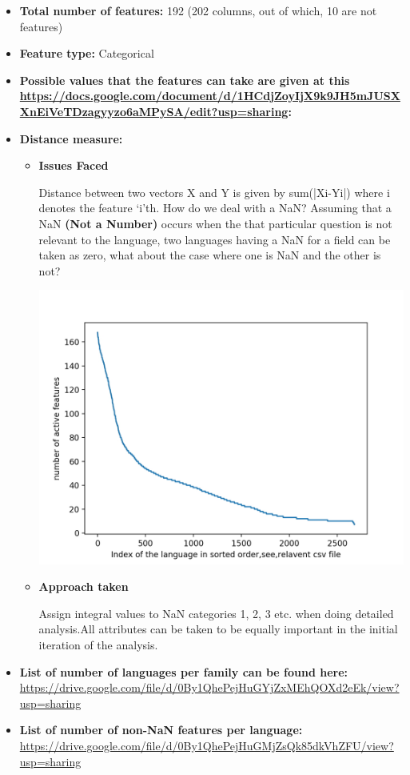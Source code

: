 \begin{itemize}
\item \textbf{Total number of features:} 192 (202 columns, out of which, 10 are not features)

 \item \textbf{Feature type:} Categorical

 \item \textbf{Possible values that the features can take are given at this \url{https://docs.google.com/document/d/1HCdjZoyIjX9k9JH5mJUSXXnEiVeTDzagyyzo6aMPySA/edit?usp=sharing}:}

 \item \textbf{Distance measure:}

\begin{itemize}
\item 
 \textbf{Issues Faced}

 Distance between two vectors X and Y is given by sum(|Xi-Yi|) where i denotes the feature ‘i’th. How do we deal with a NaN? Assuming that a NaN \textbf{(Not a Number)} occurs when the that particular question is not relevant to the language, two languages having a NaN for a field can be taken as zero, what about the case where one is NaN and the other is not?

 \includegraphics[scale=0.18]{"images/6_01.jpg"}

 \item 
 \textbf{Approach taken}

 Assign integral values to NaN categories 1, 2, 3 etc. when doing detailed analysis.All attributes can be taken to be equally important in the initial iteration of the analysis.

\end{itemize}

\item \textbf{List of number of languages per family can be found here:} \url{https://drive.google.com/file/d/0By1QhePejHuGYjZxMEhQOXd2eEk/view?usp=sharing}

 \item \textbf{List of number of non-NaN features per language:} \url{https://drive.google.com/file/d/0By1QhePejHuGMjZsQk85dkVhZFU/view?usp=sharing}

\end{itemize}

